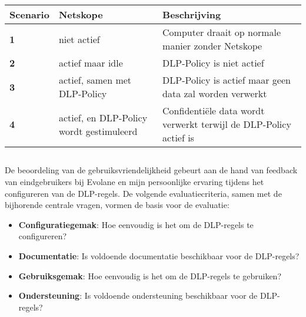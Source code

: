 \begin{table}[h]
    \centering
    \small
    \scriptsize
    \begin{tabular}{p{1cm} p{5cm} p{8cm}}
        \toprule
        \textbf{Scenario} & \textbf{Netskope} & \textbf{Beschrijving} \\
        \midrule
        \textbf{1} & niet actief & Computer draait op normale manier zonder Netskope \\
        \textbf{2} & actief maar idle & DLP-Policy is niet actief \\
        \textbf{3} & actief, samen met DLP-Policy & DLP-Policy is actief maar geen data zal worden verwerkt \\
        \textbf{4} & actief, en DLP-Policy wordt gestimuleerd & Confidentiële data wordt verwerkt terwijl de DLP-Policy actief is \\
        \bottomrule
    \end{tabular}
    \caption{}
    \label{tab:test-scenarios-performance}
\end{table}

\subsection{}
\label{sec:gebruiksvriendelijkheid}

De beoordeling van de gebruiksvriendelijkheid gebeurt aan de hand van feedback van eindgebruikers bij Evolane en mijn persoonlijke ervaring tijdens het configureren van de DLP-regels. 
De volgende evaluatiecriteria, samen met de bijhorende centrale vragen, vormen de basis voor de evaluatie:

\begin{itemize}\small
    \item \textbf{Configuratiegemak}: Hoe eenvoudig is het om de DLP-regels te configureren?
    \item \textbf{Documentatie}: Is voldoende documentatie beschikbaar voor de DLP-regels?
    \item \textbf{Gebruiksgemak}: Hoe eenvoudig is het om de DLP-regels te gebruiken?
    \item \textbf{Ondersteuning}: Is voldoende ondersteuning beschikbaar voor de DLP-regels?
    \label{sec:gebruiksvriendelijkheid-criteria}
\end{itemize}

